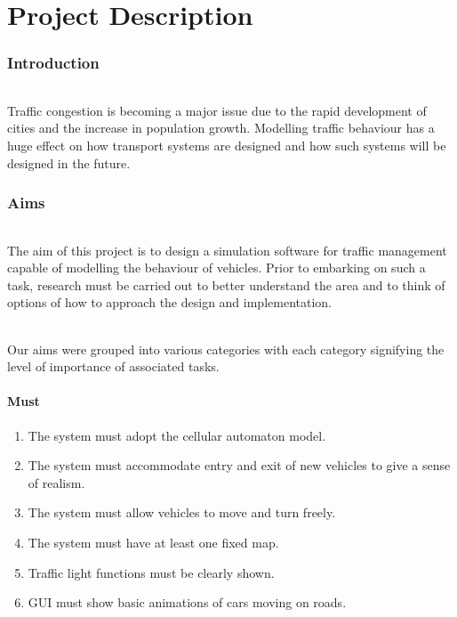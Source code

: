 \documentclass[11pt, a4paper]{article}
\begin{document}
\part*{Project Description}
\section{Introduction} \label{introduction}
\paragraph{}
Traffic congestion is becoming a major issue due to the rapid development of cities and the increase in population growth. Modelling traffic behaviour has a huge effect on how transport systems are designed and how such systems will be designed in the future.

\section{Aims} \label{aims}
\paragraph{}
The aim of this project is to design a simulation software for traffic management capable of modelling the behaviour of vehicles. Prior to embarking on such a task, research must be carried out to better understand the area and to think of options of how to approach the design and implementation.

\paragraph{}
Our aims were grouped into various categories with each category signifying the level of importance of associated tasks.

\subsection{Must} \label{sub:must}
\begin{enumerate}[itemsep = -1ex]
\item The system must adopt the cellular automaton model.
\item The system must accommodate entry and exit of new vehicles to give a sense of realism.
\item The system must allow vehicles to move and turn freely.
\item The system must have at least one fixed map.
\item Traffic light functions must be clearly shown.
\item GUI must show basic animations of cars moving on roads.
\end{enumerate}
\end{document}
